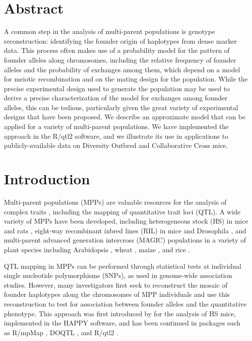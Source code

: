 \documentclass[12pt,letterpaper]{article}\usepackage[]{graphicx}\usepackage[table]{xcolor}
\begin{document}
\clearpage

\section*{Abstract}

A common step in the analysis of multi-parent populations is genotype
reconstruction: identifying the founder origin of haplotypes from
dense marker data. This process often makes use of a probability model
for the pattern of founder alleles along chromosomes, including the
relative frequency of founder alleles and the probability of exchanges
among them, which depend on a model for meiotic recombination and on
the mating design for the population. While the precise experimental
design used to generate the population may be used to derive a precise
characterization of the model for exchanges among founder alleles,
this can be tedious, particularly given the great variety of
experimental designs that have been proposed. We describe an
approximate model that can be applied for a variety of multi-parent
populations. We have implemented the approach in the R/qtl2 software,
and we illustrate its use in applications to publicly-available data
on Diversity Outbred and Collaborative Cross mice.




\clearpage
\section*{Introduction}

Multi-parent populations (MPPs) are valuable resources for the
analysis of complex traits \citep{dekoning2017}, including the mapping
of quantitative trait loci (QTL). A wide variety of MPPs have been
developed, including heterogeneous stock (HS) in mice \citep{mott2000} and
rats \citep{solberg2010}, eight-way recombinant inbred lines (RIL) in mice
\citep{ctc2004} and Drosophila \citep{king2012}, and multi-parent
advanced generation intercross (MAGIC) populations
in a variety of plant species including Arabidopsis \citep{kover2009},
wheat \citep{cavanagh2008}, maize \citep{dellacqua2015}, and rice
\citep{bandillo2013}.

QTL mapping in MPPs can be performed through statistical
tests at individual single nucleotide polymorphisms (SNPs), as used
in genome-wide association studies. However, many investigators
first seek to reconstruct the mosaic of founder haplotypes along the
chromosomes of MPP individuals and use this reconstruction to
test for association between founder alleles and the quantitative
phenotype. This approach was first introduced by \citet{mott2000} for
the analysis of HS mice, implemented in the HAPPY software,
and has been continued in packages such as R/mpMap \citep{huang2011},
DOQTL \citep{gatti2014}, and R/qtl2 \citep{rqtl2}.
\end{document}
